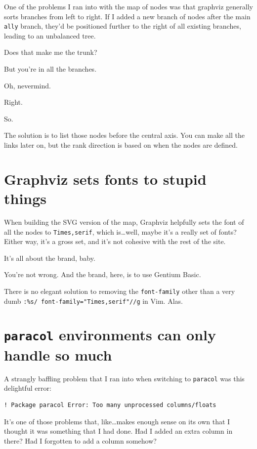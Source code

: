 \begin{paracol}{2}
\begin{leftcolumn}
One of the problems I ran into with the map of nodes was that graphviz generally sorts branches from left to right. If I added a new branch of nodes after the main \texttt{ally} branch, they'd be positioned further to the right of all existing branches, leading to an unbalanced tree.

\begin{ally}
  Does that make me the trunk?
\end{ally}
But you're in all the branches.

\begin{ally}
  Oh, nevermind.
\end{ally}
Right.

So.

The solution is to list those nodes before the central axis. You can make all the links later on, but the rank direction is based on when the nodes are defined.

\section*{Graphviz sets fonts to stupid things}\label{svgfont}

When building the SVG version of the map, Graphviz helpfully sets the font of all the nodes to \texttt{Times,serif}, which is\ldots{}well, maybe it's a really set of fonts? Either way, it's a gross set, and it's not cohesive with the rest of the site.

\begin{ally}
  It's all about the brand, baby.
\end{ally}
You're not wrong. And the brand, here, is to use Gentium Basic.

There is no elegant solution to removing the \texttt{font-family} other than a very dumb \texttt{:\%s/ font-family="Times,serif"//g} in Vim. Alas.

\section*{\texttt{paracol} environments can only handle so much}\label{toofull}

A strangly baffling problem that I ran into when switching to \texttt{paracol} was this delightful error:

\begin{verbatim}
! Package paracol Error: Too many unprocessed columns/floats
\end{verbatim}
It's one of those problems that, like\ldots{}makes enough sense on its own that I thought it was something that I had done. Had I added an extra column in there? Had I forgotten to add a column somehow?


\end{leftcolumn}
\end{paracol}

